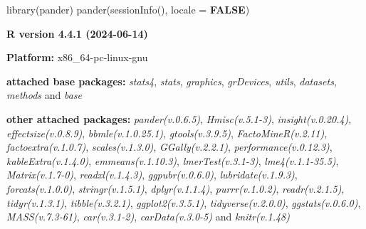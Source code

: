 \documentclass[
  bookmarksnumbered]{article}
\newenvironment{Shaded}{\begin{snugshade}}{\end{snugshade}}
\newcommand{\AttributeTok}[1]{\textcolor[rgb]{0.80,0.80,0.80}{#1}}
\newcommand{\ConstantTok}[1]{\textcolor[rgb]{0.86,0.64,0.64}{\textbf{#1}}}
\newcommand{\FunctionTok}[1]{\textcolor[rgb]{0.94,0.94,0.56}{#1}}
\newcommand{\NormalTok}[1]{\textcolor[rgb]{0.80,0.80,0.80}{#1}}
\begin{document}
\begin{Shaded}
\begin{Highlighting}[]
\FunctionTok{library}\NormalTok{(pander)}
\FunctionTok{pander}\NormalTok{(}\FunctionTok{sessionInfo}\NormalTok{(), }\AttributeTok{locale =} \ConstantTok{FALSE}\NormalTok{)}
\end{Highlighting}
\end{Shaded}

\textbf{R version 4.4.1 (2024-06-14)}

\textbf{Platform:} x86\_64-pc-linux-gnu

\textbf{attached base packages:}
\emph{stats4}, \emph{stats}, \emph{graphics}, \emph{grDevices}, \emph{utils}, \emph{datasets}, \emph{methods} and \emph{base}

\textbf{other attached packages:}
\emph{pander(v.0.6.5)}, \emph{Hmisc(v.5.1-3)}, \emph{insight(v.0.20.4)}, \emph{effectsize(v.0.8.9)}, \emph{bbmle(v.1.0.25.1)}, \emph{gtools(v.3.9.5)}, \emph{FactoMineR(v.2.11)}, \emph{factoextra(v.1.0.7)}, \emph{scales(v.1.3.0)}, \emph{GGally(v.2.2.1)}, \emph{performance(v.0.12.3)}, \emph{kableExtra(v.1.4.0)}, \emph{emmeans(v.1.10.3)}, \emph{lmerTest(v.3.1-3)}, \emph{lme4(v.1.1-35.5)}, \emph{Matrix(v.1.7-0)}, \emph{readxl(v.1.4.3)}, \emph{ggpubr(v.0.6.0)}, \emph{lubridate(v.1.9.3)}, \emph{forcats(v.1.0.0)}, \emph{stringr(v.1.5.1)}, \emph{dplyr(v.1.1.4)}, \emph{purrr(v.1.0.2)}, \emph{readr(v.2.1.5)}, \emph{tidyr(v.1.3.1)}, \emph{tibble(v.3.2.1)}, \emph{ggplot2(v.3.5.1)}, \emph{tidyverse(v.2.0.0)}, \emph{ggstats(v.0.6.0)}, \emph{MASS(v.7.3-61)}, \emph{car(v.3.1-2)}, \emph{carData(v.3.0-5)} and \emph{knitr(v.1.48)}
\end{document}
